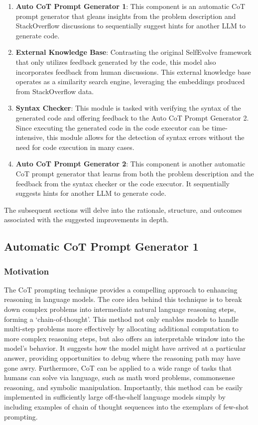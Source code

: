 \documentclass[a4paper,oneside]{book}
\begin{document}
\begin{enumerate}
    \item \textbf{Auto CoT Prompt Generator 1}: This component is an automatic CoT prompt generator that gleans insights from the problem description and StackOverflow discussions to sequentially suggest hints for another LLM to generate code.
    \item \textbf{External Knowledge Base}: Contrasting the original SelfEvolve framework that only utilizes feedback generated by the code, this model also incorporates feedback from human discussions. This external knowledge base operates as a similarity search engine, leveraging the embeddings produced from StackOverflow data.
    \item \textbf{Syntax Checker}: This module is tasked with verifying the syntax of the generated code and offering feedback to the Auto CoT Prompt Generator 2. Since executing the generated code in the code executor can be time-intensive, this module allows for the detection of syntax errors without the need for code execution in many cases.
    \item \textbf{Auto CoT Prompt Generator 2}: This component is another automatic CoT prompt generator that learns from both the problem description and the feedback from the syntax checker or the code executor. It sequentially suggests hints for another LLM to generate code.
\end{enumerate}

The subsequent sections will delve into the rationale, structure, and outcomes associated with the suggested improvements in depth.

\subsection{Automatic CoT Prompt Generator 1}
\subsubsection{Motivation}
The CoT prompting technique provides a compelling approach to enhancing reasoning in language models. The core idea behind this technique is to break down complex problems into intermediate natural language reasoning steps, forming a `chain-of-thought'. This method not only enables models to handle multi-step problems more effectively by allocating additional computation to more complex reasoning steps, but also offers an interpretable window into the model's behavior. It suggests how the model might have arrived at a particular answer, providing opportunities to debug where the reasoning path may have gone awry. Furthermore, CoT can be applied to a wide range of tasks that humans can solve via language, such as math word problems, commonsense reasoning, and symbolic manipulation. Importantly, this method can be easily implemented in sufficiently large off-the-shelf language models simply by including examples of chain of thought sequences into the exemplars of few-shot prompting.
\end{document}
